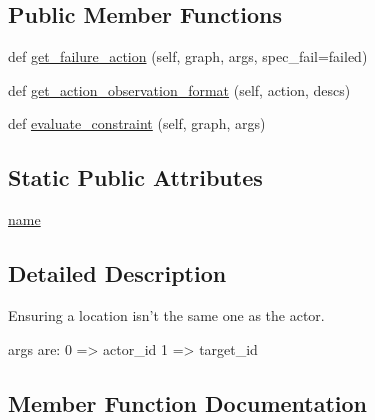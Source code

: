 \subsection*{Public Member Functions}
\begin{DoxyCompactItemize}
\item 
def \hyperlink{classlight__chats_1_1graph_1_1NotLocationOfConstraint_a77abc55b110bb7287c88b7623fe06d13}{get\+\_\+failure\+\_\+action} (self, graph, args, spec\+\_\+fail=\textquotesingle{}failed\textquotesingle{})
\item 
def \hyperlink{classlight__chats_1_1graph_1_1NotLocationOfConstraint_a4b286f6eeac9d64784dc03087771dc72}{get\+\_\+action\+\_\+observation\+\_\+format} (self, action, descs)
\item 
def \hyperlink{classlight__chats_1_1graph_1_1NotLocationOfConstraint_a0ce5d519bdec3eb540e09bdec4cc3bef}{evaluate\+\_\+constraint} (self, graph, args)
\end{DoxyCompactItemize}
\subsection*{Static Public Attributes}
\begin{DoxyCompactItemize}
\item 
\hyperlink{classlight__chats_1_1graph_1_1NotLocationOfConstraint_ace5fdafd6b230645ba96317bbf254c42}{name}
\end{DoxyCompactItemize}


\subsection{Detailed Description}
\begin{DoxyVerb}Ensuring a location isn't the same one as the actor.

args are:     0 => actor_id     1 => target_id
\end{DoxyVerb}
 

\subsection{Member Function Documentation}
\mbox{\label{classlight__chats_1_1graph_1_1NotLocationOfConstraint_a0ce5d519bdec3eb540e09bdec4cc3bef}} 
